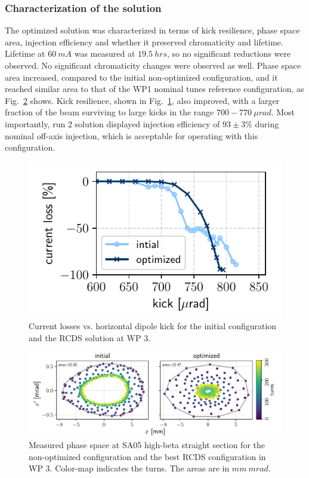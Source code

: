 \subsubsection{Characterization of the solution}
The optimized solution was characterized in terms of kick resilience, phase space area, injection efficiency and whether it preserved chromaticity and lifetime.  Lifetime at $60~\unit{mA}$ was measured at $19.5~\unit{hrs}$, so no significant reductions were observed. No significant chromaticity changes were observed as well. Phase space area increased, compared to the initial non-optimized configuration, and it reached similar area to that of the WP1 nominal tunes reference configuration, as Fig.~\ref{fig:wp3_phase_space} shows. Kick resilience, shown in Fig.~\ref{fig:wp3_kick_res}, also improved, with a larger fraction of the beam surviving to large kicks in the range  $700-770~\unit{\mu rad}$. Most importantly, run 2 solution displayed injection efficiency of $93\pm3\%$ during nominal off-axis injection, which is acceptable for operating with this configuration.
\begin{figure}[tb]
    \centering
    \includegraphics[width=0.6\columnwidth]{Images/wp3_kick_resilience.pdf}
    \caption[Current losses vs. horizontal dipole kick for the initial configuration and the RCDS solution at WP 3.]{Current losses vs. horizontal dipole kick for the initial configuration and the RCDS solution at WP 3.}
    \label{fig:wp3_kick_res}
\end{figure}
\begin{figure}[tb]
    \centering
    \includegraphics[width=\textwidth]{Images/wp3_phase_space.pdf}
    \caption[Measured phase space at SA05 high-beta straight section for the non-optimized configuration and the best RCDS configuration in WP 3.]{Measured phase space at SA05 high-beta straight section for the non-optimized configuration and the best RCDS configuration in WP 3. Color-map indicates the turns. The areas are in $\unit{mm}~\unit{mrad}$.}
    \label{fig:wp3_phase_space}

\end{figure}
